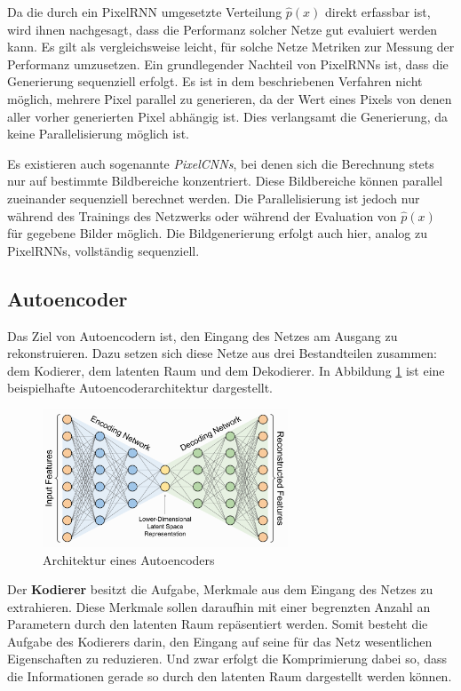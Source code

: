 Da die durch ein \ac{PixelRNN} umgesetzte Verteilung $\hat{p}(x)$ direkt erfassbar ist, wird ihnen nachgesagt, dass die Performanz solcher Netze gut evaluiert werden kann. Es gilt als vergleichsweise leicht, für solche Netze Metriken zur Messung der Performanz umzusetzen. Ein grundlegender Nachteil von \acp{PixelRNN} ist, dass die Generierung sequenziell erfolgt. Es ist in dem beschriebenen Verfahren nicht möglich, mehrere Pixel parallel zu generieren, da der Wert eines Pixels von denen aller vorher generierten Pixel abhängig ist. Dies verlangsamt die Generierung, da keine Parallelisierung möglich ist. \cite{generativeModelsSurvey}

Es existieren auch sogenannte \emph{PixelCNNs}, bei denen sich die Berechnung stets nur auf bestimmte Bildbereiche konzentriert. Diese Bildbereiche können parallel zueinander sequenziell berechnet werden. Die Parallelisierung ist jedoch nur während des Trainings des Netzwerks oder während der Evaluation von $\hat{p}(x)$ für gegebene Bilder möglich. Die Bildgenerierung erfolgt auch hier, analog zu \acp{PixelRNN}, vollständig sequenziell. \cite{pixelRNN}

\subsection{Autoencoder}

Das Ziel von Autoencodern ist, den Eingang des Netzes am Ausgang zu rekonstruieren. Dazu setzen sich diese Netze aus drei Bestandteilen zusammen: dem Kodierer, dem latenten Raum und dem Dekodierer. In Abbildung \ref{fig:Autoencoder} ist eine beispielhafte Autoencoderarchitektur dargestellt.

\begin{figure}[H]
   \centering
   \includegraphics[width=0.65\textwidth]{images/Generative Networks/autoencoder_architecture.png}
   \caption{Architektur eines Autoencoders}
   \label{fig:Autoencoder}
\end{figure}

Der \textbf{Kodierer} besitzt die Aufgabe, Merkmale aus dem Eingang des Netzes zu extrahieren. Diese Merkmale sollen daraufhin mit einer begrenzten Anzahl an Parametern durch den latenten Raum repäsentiert werden. Somit besteht die Aufgabe des Kodierers darin, den Eingang auf seine für das Netz wesentlichen Eigenschaften zu reduzieren. Und zwar erfolgt die Komprimierung dabei so, dass die Informationen gerade so durch den latenten Raum dargestellt werden können. 

